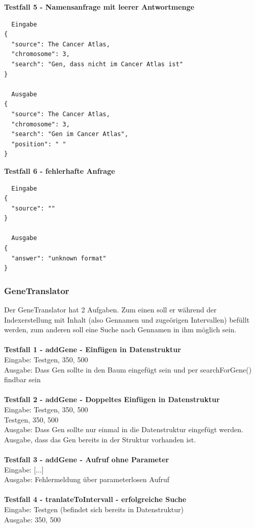 \textbf{Testfall 5 - Namensanfrage mit leerer Antwortmenge}
\begin{verbatim}
  Eingabe
{
  "source": The Cancer Atlas,
  "chromosome": 3,
  "search": "Gen, dass nicht im Cancer Atlas ist"
}

  Ausgabe
{
  "source": The Cancer Atlas,
  "chromosome": 3,
  "search": "Gen im Cancer Atlas",
  "position": " "
}
\end{verbatim}
\textbf{Testfall 6 - fehlerhafte Anfrage}
\begin{verbatim}
  Eingabe
{
  "source": ""
}

  Ausgabe
{
  "answer": "unknown format"
}
\end{verbatim}
\newpage
\subsubsection{GeneTranslator}
Der GeneTranslator hat 2 Aufgaben. Zum einen soll er während der Indexerstellung mit Inhalt (also Gennamen und zugeörigen Intervallen) befüllt werden, zum anderen soll eine Suche nach Gennamen in ihm möglich sein.\\
\\
\textbf{Testfall 1 - addGene - Einfügen in Datenstruktur}\\
Eingabe: Testgen, 350, 500\\
Ausgabe: Dass Gen sollte in den Baum eingefügt sein und per searchForGene() findbar sein\\
\\
\textbf{Testfall 2 - addGene - Doppeltes Einfügen in Datenstruktur}\\
Eingabe: Testgen, 350, 500\\
		 Testgen, 350, 500\\
Ausgabe: Dass Gen sollte nur einmal in die Datenstruktur eingefügt werden. Ausgabe, dass das Gen bereits in der Struktur vorhanden ist.\\
\\
\textbf{Testfall 3 - addGene - Aufruf ohne Parameter}\\
Eingabe: [...]\\
Ausgabe: Fehlermeldung über  parameterlosen Aufruf\\
\\
\textbf{Testfall 4 - tranlateToIntervall - erfolgreiche Suche}\\
Eingabe: Testgen (befindet sich bereits in Datenstruktur)\\
Ausgabe: 350, 500\\
\\
